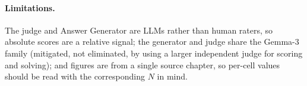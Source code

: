 \paragraph{Limitations.} The judge and Answer Generator are LLMs rather than human
raters, so absolute scores are a relative signal; the generator and judge share the
Gemma-3 family (mitigated, not eliminated, by using a larger independent judge for
scoring and solving); and figures are from a single source chapter, so per-cell
values should be read with the corresponding $N$ in mind.
